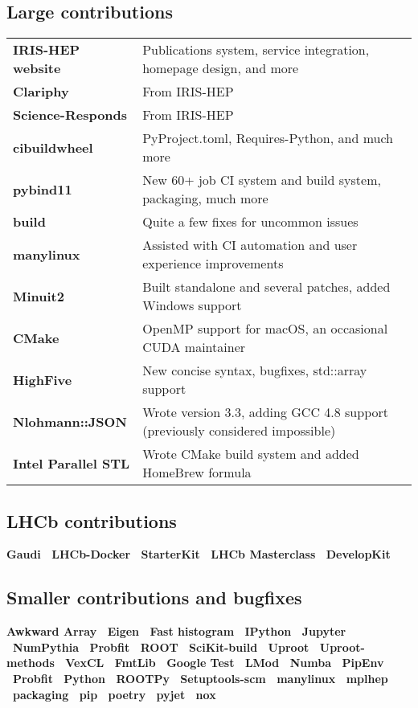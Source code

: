 \documentclass[10pt,letterpaper]{moderncv}
\begin{document}
\subsection{Large contributions}
\begin{tabularx}{\textwidth}{>{\bfseries}p{1.4in}X}
	IRIS-HEP website & Publications system, service integration, homepage design, and more \\
	Clariphy         & From IRIS-HEP \\
	Science-Responds & From IRIS-HEP \\
	cibuildwheel   & PyProject.toml, Requires-Python, and much more \\
	pybind11       & New 60+ job CI system and build system, packaging, much more \\
    build          & Quite a few fixes for uncommon issues \\
    manylinux & Assisted with CI automation and user experience improvements \\
	Minuit2        & Built standalone and several patches, added Windows support \\
	CMake          & OpenMP support for macOS, an occasional CUDA maintainer  \\
	HighFive       & New concise syntax, bugfixes, std::array support  \\
	Nlohmann::JSON & Wrote version 3.3, adding GCC 4.8 support (previously considered impossible) \\
	Intel Parallel STL & Wrote CMake build system and added HomeBrew formula \\
\end{tabularx}

\subsection{LHCb contributions}
\textbf{%
	Gaudi \textbullet\ 
	LHCb-Docker \textbullet\ 
	StarterKit \textbullet\ 
	LHCb Masterclass \textbullet\ 
	DevelopKit
}

\subsection{Smaller contributions and bugfixes}
\textbf{%
	Awkward Array \textbullet\ 
	Eigen  \textbullet\ 
	Fast histogram \textbullet\  
	IPython \textbullet\ 
	Jupyter \textbullet\ 
	NumPythia \textbullet\ 
	Probfit  \textbullet\ 
	ROOT \textbullet\ 
	SciKit-build \textbullet\ 
	Uproot  \textbullet\ 
	Uproot-methods \textbullet\ 
	VexCL \textbullet\ 
    FmtLib \textbullet\ 
    Google Test  \textbullet\ 
    LMod \textbullet\
    Numba \textbullet\  
    PipEnv \textbullet\ 
    Probfit \textbullet\ 
    Python \textbullet\ 
    ROOTPy \textbullet\ 
    Setuptools-scm \textbullet\ 
    manylinux \textbullet\ 
    mplhep \textbullet\ 
    packaging \textbullet\ 
    pip \textbullet\ 
    poetry \textbullet\ 
    pyjet \textbullet\
    nox
}
\end{document}
